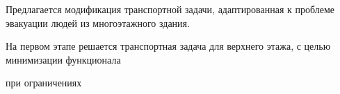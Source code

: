 
Предлагается модификация транспортной задачи, адаптированная к проблеме
эвакуации людей из многоэтажного здания.

На первом этапе решается транспортная задача для верхнего этажа, с целью
минимизации функционала


при ограничениях

% 
% 

